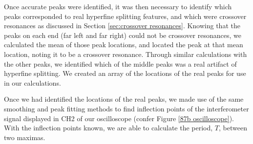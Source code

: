 \documentclass[twocolumn,amsmath,amssymb,pra, floatfix]{revtex4-2}
\begin{document}
Once accurate peaks were identified, it was then necessary to identify which peaks corresponded to real hyperfine splitting features, and which were crossover resonances as discussed in Section \ref{sec:crossover resonances}. Knowing that the peaks on each end (far left and far right) could not be crossover resonances, we calculated the mean of those peak locations, and located the peak at that mean location, noting it to be a crossover resonance. Through similar calculations with the other peaks, we identified which of the middle peaks was a real artifact of hyperfine splitting. We created an array of the locations of the real peaks for use in our calculations.

Once we had identified the locations of the real peaks, we made use of the same smoothing and peak fitting methods to find inflection points of the interferometer signal displayed in CH2 of our oscilloscope (confer Figure \ref{87b oscilloscope}).
With the inflection points known, we are able to calculate the period, $T$, between two maximas.
\end{document}

